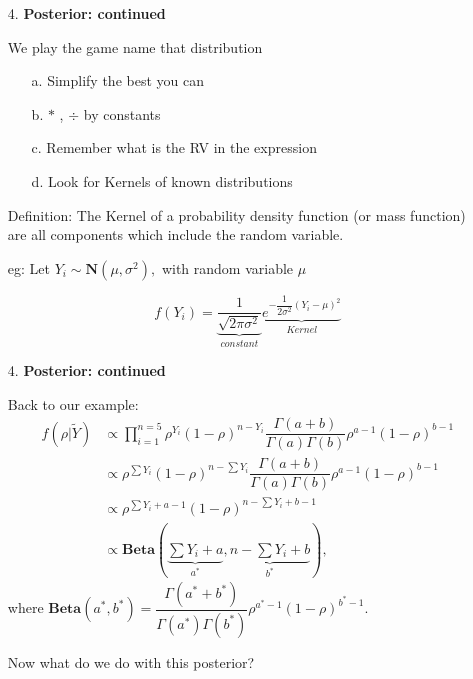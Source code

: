 \documentclass[12pt,xcolor=svgnames]{beamer}
\newcommand{\rd}{\color{red}}
\newcommand{\bl}{\color{blue}}
\newcommand{\sk}{\vspace{.4cm}}
\begin{document}
\begin{frame}
\begin{enumerate}

\item[4. ] {\bf Posterior: continued} 

We play the game {\bl name that distribution}
\begin{enumerate}
\item[a.] Simplify the best you can
\item[b.] $\ast$ , $\div$ by constants
\item[c.] Remember what is the RV in the expression
\item[d.] Look for {\bl Kernels} of known distributions
\end{enumerate}
\sk
{\rd Definition:} The {\bl Kernel} of a probability density function (or mass function) are all components which include the random variable. 

eg: Let $Y_i \sim \textbf{N}(\mu, \sigma^2),$ with random variable $\mu$

$$ f(Y_i) = \underbrace{\dfrac{1}{\sqrt{2\pi \sigma^2}}}_{constant} \underbrace{e^{-\dfrac{1}{2\sigma^2}(Y_i - \mu)^2}}_{Kernel}$$ 
\end{enumerate}
\end{frame}


\begin{frame}
\begin{enumerate}

\item[4. ] {\bf Posterior: continued} 

Back to our example: 
\begin{align*}
f(\rho|\tilde{Y}) &\propto  \prod_{i=1}^{n=5} \rho^{Y_i} (1- \rho)^{n-Y_i} \dfrac{\Gamma (a+b)}{\Gamma (a)\Gamma (b)} \rho^{a-1} (1-\rho)^{b-1}\\
&\propto \rho^{\sum Y_i} (1- \rho)^{n-\sum Y_i} \dfrac{\Gamma (a+b)}{\Gamma (a)\Gamma (b)} \rho^{a-1} (1-\rho)^{b-1}\\
&\propto \rho^{\sum Y_i +a -1} (1- \rho)^{n-\sum Y_i +b -1} \\
&\propto \textbf{Beta} \left(\underbrace{\sum Y_i +a}_{a^*}, \underbrace{n-\sum Y_i +b}_{b^*}\right),
\end{align*}
where
$ \textbf{Beta}(a^*, b^*) = \dfrac{\Gamma (a^*+b^*)}{\Gamma (a^*)\Gamma (b^*)} \rho^{a^*-1} (1-\rho)^{b^*-1}.$

{\rd Now what do we do with this posterior?}

\end{enumerate}
\end{frame}
\end{document}
